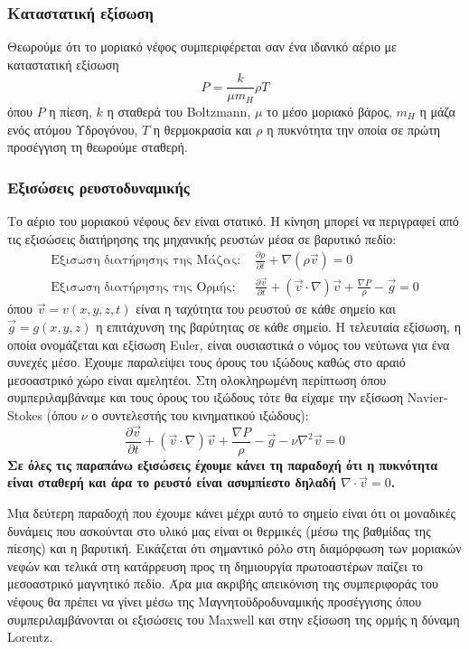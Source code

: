 \documentclass[a4paper,12pt]{memoir}
\newcommand{\pt}[1]{\frac{\partial #1}{\partial t}}
\newcommand{\vv}{\vec{v}}
\begin{document}
\subsubsection{Καταστατική εξίσωση}
Θεωρούμε ότι το μοριακό νέφος συμπεριφέρεται σαν ένα ιδανικό αέριο με καταστατική εξίσωση
\begin{equation}
P=\frac{k}{\mu m_{H}} \rho T
\end{equation}
όπου $P$ η πίεση, $k$ η σταθερά του Boltzmann, $\mu$ το μέσο μοριακό βάρος, $m_{H}$ η μάζα ενός ατόμου Υδρογόνου, $T$ η θερμοκρασία και $\rho$ η πυκνότητα την οποία σε πρώτη προσέγγιση τη θεωρούμε σταθερή.
\subsubsection{Εξισώσεις ρευστοδυναμικής}
Το αέριο του μοριακού νέφους δεν είναι στατικό. Η κίνηση μπορεί να περιγραφεί από τις εξισώσεις διατήρησης της μηχανικής ρευστών μέσα σε βαρυτικό πεδίο:
\begin{align}
\text{Εξισωση διατήρησης της Μάζας:  } &\pt{\rho} + \nabla (\rho \vv)=0 \\
\text{Εξισωση διατήρησης της Ορμής:  } &\pt{\vv} +(\vv \cdot \nabla) \vv +\frac{\nabla P}{\rho} -\vec{g}=0
\label{eq:euler}
\end{align}
όπου $\vv=v(x,y,z,t)$ είναι η ταχύτητα του ρευστού σε κάθε σημείο και $\vec{g}=g(x,y,z)$ η επιτάχυνση της βαρύτητας σε κάθε σημείο.
Η τελευταία εξίσωση, η οποία ονομάζεται και εξίσωση Euler, είναι ουσιαστικά ο νόμος του νεύτωνα για ένα συνεχές μέσο.
Έχουμε παραλείψει τους όρους του ιξώδους καθώς στο αραιό μεσοαστρικό χώρο είναι αμελητέοι. Στη ολοκληρωμένη περίπτωση όπου συμπεριλαμβάναμε και τους όρους του ιξώδους τότε θα είχαμε την εξίσωση Navier-Stokes (όπου $\nu$ ο συντελεστής του κινηματικού ιξώδους): 
$$
\pt{\vv} +(\vv \cdot \nabla) \vv +\frac{\nabla P}{\rho} -\vec{g}-\nu \nabla ^2 \vv=0
$$
\textbf{Σε όλες τις παραπάνω εξισώσεις έχουμε κάνει τη παραδοχή ότι η πυκνότητα είναι σταθερή και άρα το ρευστό είναι ασυμπίεστο δηλαδή $\nabla \cdot \vv = 0$.}

Μια δεύτερη παραδοχή που έχουμε κάνει μέχρι αυτό το σημείο είναι ότι οι μοναδικές δυνάμεις που ασκούνται στο υλικό μας είναι οι θερμικές (μέσω της βαθμίδας της πίεσης) και η βαρυτική. Εικάζεται ότι σημαντικό ρόλο στη διαμόρφωση των μοριακών νεφών και τελικά στη κατάρρευση προς τη δημιουργία πρωτοαστέρων παίζει το μεσοαστρικό μαγνητικό πεδίο. Άρα μια ακριβής απεικόνιση της συμπεριφοράς του νέφους θα πρέπει να γίνει μέσω της Μαγνητοϋδροδυναμικής προσέγγισης όπου συμπεριλαμβάνονται οι εξισώσεις του Maxwell και στην εξίσωση της ορμής η δύναμη Lorentz.    
\end{document}
